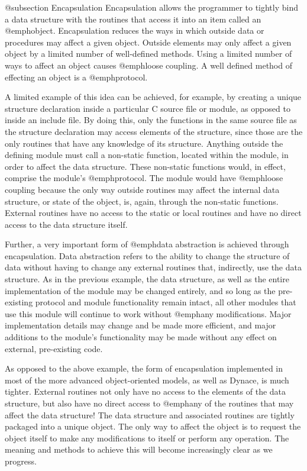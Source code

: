 @subsection Encapsulation
Encapsulation allows the programmer to tightly bind a data structure
with the routines that access it into an item called an @emph{object}.
Encapsulation reduces the ways in which outside data or procedures may
affect a given object.  Outside elements may only affect a given object
by a limited number of well-defined methods.  Using a limited number of
ways to affect an object causes @emph{loose coupling}.  A well defined
method of effecting an object is a @emph{protocol}.

A limited example of this idea can be achieved, for example, by creating
a unique structure declaration inside a particular C source file or
module, as opposed to inside an include file.  By doing this, only the
functions in the same source file as the structure declaration may
access elements of the structure, since those are the only routines
that have any knowledge of its structure.  Anything outside the
defining module must call a non-static function, located within the
module, in order to affect the data structure.  These non-static
functions would, in effect, comprise the module's @emph{protocol}.  The
module would have @emph{loose coupling} because the only way outside
routines may affect the internal data structure, or state of the object,
is, again, through the non-static functions.  External routines have no
access to the static or local routines and have no direct access to
the data structure itself.

Further, a very important form of @emph{data abstraction} is achieved
through encapsulation. Data abstraction refers to the ability to change
the structure of data without having to change any external routines
that, indirectly, use the data structure.  As in the previous example,
the data structure, as well as the entire implementation of the module
may be changed entirely, and so long as the pre-existing protocol and
module functionality remain intact, all other modules that use this
module will continue to work without @emph{any} modifications.  Major
implementation details may change and be made more efficient, and
major additions to the module's functionality may be made without
any effect on external, pre-existing code.

As opposed to the above example, the form of encapsulation implemented
in most of the more advanced object-oriented models, as well as Dynace, is
much tighter.  External routines not only have no access to the elements
of the data structure, but also have no direct access to @emph{any} of
the routines that may affect the data structure!  The data structure
and associated routines are tightly packaged into a unique object.  The
only way to affect the object is to request the object itself to make
any modifications to itself or perform any operation.  The meaning and
methods to achieve this will become increasingly clear as we progress.


